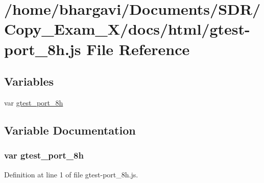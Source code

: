 \hypertarget{gtest-port__8h_8js}{}\section{/home/bhargavi/\+Documents/\+S\+D\+R/\+Copy\+\_\+\+Exam\+\_\+X/docs/html/gtest-\/port\+\_\+8h.js File Reference}
\label{gtest-port__8h_8js}
\subsection*{Variables}
\begin{DoxyCompactItemize}
\item 
var \hyperlink{gtest-port__8h_8js_a679102c8a4e8868f646e916dae989a59}{gtest\+\_\+port\+\_\+8h}
\end{DoxyCompactItemize}


\subsection{Variable Documentation}
\subsubsection[{\texorpdfstring{gtest\+\_\+port\+\_\+8h}{gtest_port_8h}}]{\setlength{\rightskip}{0pt plus 5cm}var gtest\+\_\+port\+\_\+8h}\hypertarget{gtest-port__8h_8js_a679102c8a4e8868f646e916dae989a59}{}\label{gtest-port__8h_8js_a679102c8a4e8868f646e916dae989a59}


Definition at line 1 of file gtest-\/port\+\_\+8h.\+js.

